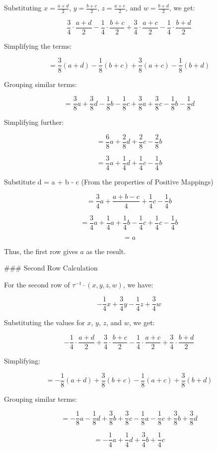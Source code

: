 \documentclass[11pt]{amsart}
\theoremstyle{definition}
\begin{document}
Substituting $x = \frac{a + d}{2}$, $y = \frac{b + c}{2}$, $z = \frac{a + c}{2}$, and $w = \frac{b + d}{2}$, we get:

\[
\frac{3}{4} \cdot \frac{a + d}{2} - \frac{1}{4} \cdot \frac{b + c}{2} + \frac{3}{4} \cdot \frac{a + c}{2} - \frac{1}{4} \cdot \frac{b + d}{2}
\]

Simplifying the terms:

\[
= \frac{3}{8}(a + d) - \frac{1}{8}(b + c) + \frac{3}{8}(a + c) - \frac{1}{8}(b + d)
\]

Grouping similar terms:

\[
= \frac{3}{8}a + \frac{3}{8}d - \frac{1}{8}b - \frac{1}{8}c + \frac{3}{8}a + \frac{3}{8}c - \frac{1}{8}b - \frac{1}{8}d
\]

Simplifying further:

\[
= \frac{6}{8}a + \frac{2}{8}d + \frac{2}{8}c - \frac{2}{8}b 
\]

\[
= \frac{3}{4}a + \frac{1}{4}d + \frac{1}{4}c - \frac{1}{4}b 
\]

Substitute d = a + b - c (From the properties of Positive Mappings)


\[
= \frac{3}{4}a + \frac{a + b - c}{4} + \frac{1}{4}c - \frac{1}{4}b 
\]

\[
= \frac{3}{4}a + \frac{1}{4}a + \frac{1}{4}b - \frac{1}{4}c + \frac{1}{4}c - \frac{1}{4}b 
\]

\[ = a \]


Thus, the first row gives $a$ as the result.

### Second Row Calculation

For the second row of $\tau^{-1} \cdot (x, y, z, w)$, we have:

\[
-\frac{1}{4}x + \frac{3}{4}y - \frac{1}{4}z + \frac{3}{4}w
\]

Substituting the values for $x$, $y$, $z$, and $w$, we get:

\[
-\frac{1}{4} \cdot \frac{a + d}{2} + \frac{3}{4} \cdot \frac{b + c}{2} - \frac{1}{4} \cdot \frac{a + c}{2} + \frac{3}{4} \cdot \frac{b + d}{2}
\]

Simplifying:

\[
= -\frac{1}{8}(a + d) + \frac{3}{8}(b + c) - \frac{1}{8}(a + c) + \frac{3}{8}(b + d)
\]

Grouping similar terms:

\[
= -\frac{1}{8}a - \frac{1}{8}d + \frac{3}{8}b + \frac{3}{8}c - \frac{1}{8}a - \frac{1}{8}c + \frac{3}{8}b + \frac{3}{8}d
\]

\[
= -\frac{1}{4}a + \frac{1}{4}d + \frac{3}{4}b + \frac{1}{4}c 
\]
\end{document}
